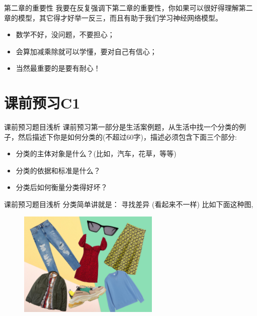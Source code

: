 \documentclass[handout]{beamer}
\begin{document}
\begin{frame}{第二章的重要性}
	我要在反复强调下第二章的重要性，你如果可以很好得理解第二章的模型，其它得才好举一反三，而且有助于我们学习神经网络模型。
	
	\hfil
	
	\begin{itemize}
	\setlength\itemsep{1em}
		\item 数学不好，没问题，不要担心；
		\item 会算加减乘除就可以学懂，要对自己有信心；
		\item 当然最重要的是要有耐心！
	\end{itemize}
\end{frame}



\section{课前预习C1}

\begin{frame}{课前预习题目浅析}
	课前预习第一部分是生活案例题，从生活中找一个分类的例子，然后描述下你是如何分类的(不超过60字)，描述必须包含下面三个部分:
	
	\hfil
	
\begin{itemize}
\setlength\itemsep{1em}
	\item 分类的主体对象是什么？(比如，汽车，花草，等等)
	\item 分类的依据和标准是什么？
	\item 分类后如何衡量分类得好坏？
\end{itemize}
\end{frame}

\begin{frame}[fragile]{课前预习题目浅析}
分类简单讲就是： 寻找差异 (看起来不一样) 比如下面这种图,
\begin{figure}[H]
	\centering
	\includegraphics[width=0.6\textwidth]{fig/clothes}
\end{figure}
\end{frame}
\end{document}
